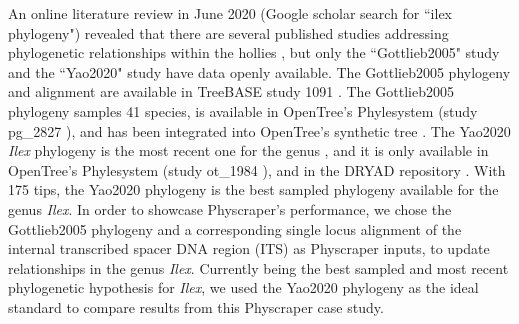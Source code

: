 \documentclass{bmcart}
\begin{document}
An online literature review in June 2020 (Google scholar search for ``ilex phylogeny")
revealed that there are several published studies addressing phylogenetic relationships within
the hollies \cite{cuenoud2000molecular, gottlieb2005molecular, manen2010history,
setoguchi2000intersectional, selbach2009new, yao2020phylogeny}, but only the ``Gottlieb2005"
study \cite{gottlieb2005molecular} and the ``Yao2020" study \cite{yao2020phylogeny}
have data openly available.
The Gottlieb2005 phylogeny and alignment are available in TreeBASE study 1091 \cite{treebase1091}.
The Gottlieb2005 phylogeny samples 41 species, is available in
OpenTree's Phylesystem (study pg\_2827 \cite{pg2827}),
and has been integrated into OpenTree's synthetic tree \cite{mrcaott68451ott89474}.
The Yao2020 \textit{Ilex} phylogeny is the most recent one for the genus \cite{yao2020phylogeny},
and it is only available in OpenTree's Phylesystem (study ot\_1984 \cite{ot1984}),
and in the DRYAD repository \cite{yao2020dryad}.
With 175 tips, the Yao2020 phylogeny \cite{yao2020phylogeny} is the best sampled phylogeny available for
the genus \textit{Ilex}.
In order to showcase Physcraper's performance, we chose the Gottlieb2005 phylogeny
and a corresponding single locus alignment of the internal transcribed
spacer DNA region (ITS) as Physcraper inputs, to update relationships in the genus \textit{Ilex}.
Currently being the best sampled and most recent phylogenetic hypothesis for \textit{Ilex},
we used the Yao2020 phylogeny as the ideal standard to compare results from this
Physcraper case study.
\end{document}
